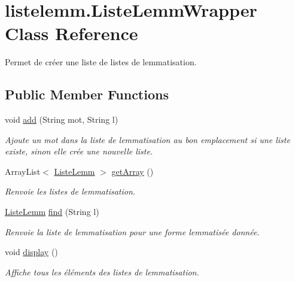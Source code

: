 \hypertarget{classlistelemm_1_1_liste_lemm_wrapper}{}\section{listelemm.\+Liste\+Lemm\+Wrapper Class Reference}
\label{classlistelemm_1_1_liste_lemm_wrapper}


Permet de créer une liste de listes de lemmatisation.  


\subsection*{Public Member Functions}
\begin{DoxyCompactItemize}
\item 
void \hyperlink{classlistelemm_1_1_liste_lemm_wrapper_a35b6b38c162b228b18588b1bca8d7032}{add} (String mot, String l)
\begin{DoxyCompactList}\small\item\em Ajoute un mot dans la liste de lemmatisation au bon emplacement si une liste existe, sinon elle crée une nouvelle liste. \end{DoxyCompactList}\item 
Array\+List$<$ \hyperlink{classlistelemm_1_1_liste_lemm}{Liste\+Lemm} $>$ \hyperlink{classlistelemm_1_1_liste_lemm_wrapper_a51d4f2820d3582fbbe7f64581cb746dc}{get\+Array} ()
\begin{DoxyCompactList}\small\item\em Renvoie les listes de lemmatisation. \end{DoxyCompactList}\item 
\hyperlink{classlistelemm_1_1_liste_lemm}{Liste\+Lemm} \hyperlink{classlistelemm_1_1_liste_lemm_wrapper_a318131112339d774b21df28dd4d3872f}{find} (String l)
\begin{DoxyCompactList}\small\item\em Renvoie la liste de lemmatisation pour une forme lemmatisée donnée. \end{DoxyCompactList}\item 
void \hyperlink{classlistelemm_1_1_liste_lemm_wrapper_aad440ddbf1be6a330e24b791306ce812}{display} ()\hypertarget{classlistelemm_1_1_liste_lemm_wrapper_aad440ddbf1be6a330e24b791306ce812}{}\label{classlistelemm_1_1_liste_lemm_wrapper_aad440ddbf1be6a330e24b791306ce812}

\begin{DoxyCompactList}\small\item\em Affiche tous les éléments des listes de lemmatisation. \end{DoxyCompactList}\end{DoxyCompactItemize}


